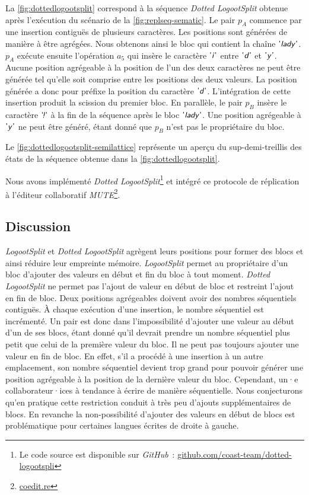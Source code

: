 La \autoref{fig:dottedlogootsplit} correspond à la séquence \emph{Dotted LogootSplit} obtenue après l'exécution du scénario de la \autoref{fig:replseq-sematic}.
Le pair $p_A$ commence par une insertion contiguës de plusieurs caractères.
Les positions sont générées de manière à être agrégées.
Nous obtenons ainsi le bloc qui contient la chaîne $\textsf{'\textit{lady}'}$.
$p_A$ exécute ensuite l'opération $a_5$ qui insère le caractère $\textsf{'\textit{i}'}$ entre $\textsf{'\textit{d}'}$ et $\textsf{'\textit{y}'}$.
Aucune position agrégeable à la position de l'un des deux caractères ne peut être générée tel qu'elle soit comprise entre les positions des deux valeurs.
La position générée a donc pour préfixe la position du caractère $\textsf{'\textit{d}'}$.
L'intégration de cette insertion produit la scission du premier bloc.
En parallèle, le pair $p_B$ insère le caractère $\textsf{'\textit{\negthinspace!}'}$ à la fin de la séquence après le bloc $\textsf{'\textit{lady}'}$.
Une position agrégeable à $\textsf{'\textit{y}'}$ ne peut être généré, étant donné que $p_B$ n'est pas le propriétaire du bloc.

Le \autoref{fig:dottedlogootsplit-semilattice} représente un aperçu du sup-demi-treillis des états de la séquence obtenue dans la \autoref{fig:dottedlogootsplit}.

Nous avons implémenté \emph{Dotted LogootSplit}\footnote{Le code source est disponible sur \emph{GitHub}~: \href{https://github.com/coast-team/dotted-logootsplit}{github.com/coast-team/dotted-logootspli}} et intégré ce protocole de réplication à l'éditeur collaboratif \emph{MUTE}\footnote{\href{https://coedit.re}{coedit.re}}.

\subsection{Discussion}

\emph{LogootSplit} et \emph{Dotted LogootSplit} agrègent leurs positions pour former des blocs et ainsi réduire leur empreinte mémoire.
\emph{LogootSplit} permet au propriétaire d'un bloc d'ajouter des valeurs en début et fin du bloc à tout moment.
\emph{Dotted LogootSplit} ne permet pas l'ajout de valeur en début de bloc et restreint l'ajout en fin de bloc.
Deux positions agrégeables doivent avoir des nombres séquentiels contiguës.
À chaque exécution d'une insertion, le nombre séquentiel est incrémenté.
Un pair est donc dans l'impossibilité d'ajouter une valeur au début d'un de ses blocs, étant donné qu'il devrait prendre un nombre séquentiel plus petit que celui de la première valeur du bloc.
Il ne peut pas toujours ajouter une valeur en fin de bloc.
En effet, s'il a procédé à une insertion à un autre emplacement, son nombre séquentiel devient trop grand pour pouvoir générer une position agrégeable à la position de la dernière valeur du bloc.
Cependant, un·e collaborateur·ices à tendance à écrire de manière séquentielle.
Nous conjecturons qu'en pratique cette restriction conduit à très peu d'ajouts supplémentaires de blocs.
En revanche la non-possibilité d'ajouter des valeurs en début de blocs est problématique pour certaines langues écrites de droite à gauche.

